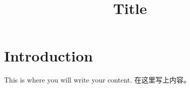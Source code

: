 \documentclass{article}
\title{Title}
\author{}
\begin{document}
\maketitle{}
\section{Introduction}
This is where you will write your content. 在这里写上内容。
\end{document}
